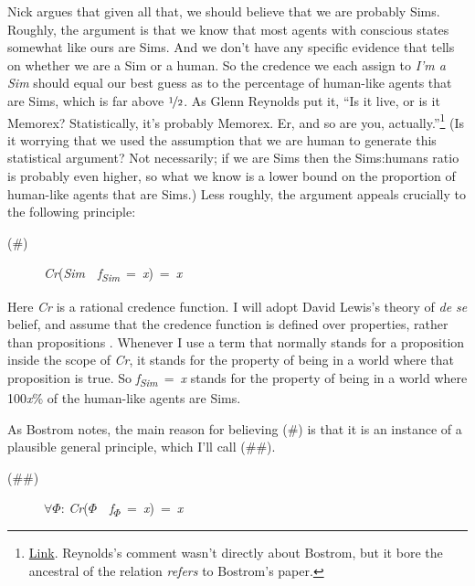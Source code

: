 Nick \citet{Bostrom2003} argues that given all that, we should believe that we are probably Sims. Roughly, the argument is that we know that most agents with conscious states somewhat like ours are Sims. And we don't have any specific evidence that tells on whether we are a Sim or a human. So the credence we each assign to \textit{I'm a Sim} should equal our best guess as to the percentage of human-like agents that are Sims, which is far above \(\nicefrac{1}{2}\). As Glenn Reynolds put it, ``Is it live, or is it Memorex? Statistically, it's probably Memorex. Er, and so are you, actually.''\footnote{\href{http://www.instapundit.com/archives/003465.php\#003465}{Link}. Reynolds's comment wasn't directly about Bostrom, but it bore the ancestral of the relation \textit{refers} to Bostrom's paper.} (Is it worrying that we used the assumption that we are human to generate this statistical argument? Not necessarily; if we are Sims then the Sims:humans ratio is probably even higher, so what we know is a lower bound on the proportion of human-like agents that are Sims.) Less roughly, the argument appeals crucially to the following principle:

\begin{description}
\item[(\#)] \textit{Cr}(\textit{Sim}~{\textbar}~\textit{f}\textit{\textsubscript{Sim}}~=~\textit{x})~=~\textit{x}
\end{description}

\noindent Here \textit{Cr} is a rational credence function. I will adopt David Lewis's theory of \textit{de se} belief, and assume that the credence function is defined over properties, rather than propositions \citet{Lewis1979b}. Whenever I use a term that normally stands for a proposition inside the scope of \textit{Cr}, it stands for the property of being in a world where that proposition is true. So \textit{f}\textit{\textsubscript{Sim}}~=~\textit{x} stands for the property of being in a world where 100\textit{x}\% of the human\nobreakdash-like agents are Sims. 

As Bostrom notes, the main reason for believing (\#) is that it is an instance of a plausible general principle, which I'll call (\#\#).

\begin{description}
\item[(\#\#)] ${\forall}{\Phi}$: \textit{Cr}(${\Phi}$~{\textbar}~\textit{f}\textsubscript{${\Phi}$}~=~\textit{x})~=~\textit{x}
\end{description}

